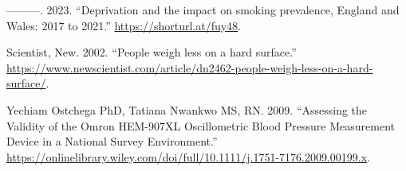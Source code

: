 \documentclass[
  11pt,
  twocolumn]{article}
\newlength{\cslhangindent}
\newenvironment{CSLReferences}[2] %
 {\begin{list}{}{%
  \setlength{\itemindent}{0pt}
  \setlength{\leftmargin}{0pt}
  \setlength{\parsep}{0pt}
  \ifodd #1
   \setlength{\leftmargin}{\cslhangindent}
   \setlength{\itemindent}{-1\cslhangindent}
  \fi
  \setlength{\itemsep}{#2\baselineskip}}}
 {\end{list}}
\begin{document}
\begin{CSLReferences}{1}{0}
---------. 2023. {``{Deprivation and the impact on smoking prevalence,
England and Wales: 2017 to 2021}.''} \url{https://shorturl.at/fuy48}.

Scientist, New. 2002. {``{People weigh less on a hard surface}.''}
\url{https://www.newscientist.com/article/dn2462-people-weigh-less-on-a-hard-surface/}.

Yechiam Ostchega PhD, Tatiana Nwankwo MS, RN. 2009. {``{Assessing the
Validity of the Omron HEM-907XL Oscillometric Blood Pressure Measurement
Device in a National Survey Environment}.''}
\url{https://onlinelibrary.wiley.com/doi/full/10.1111/j.1751-7176.2009.00199.x}.

\end{CSLReferences}
\end{document}
